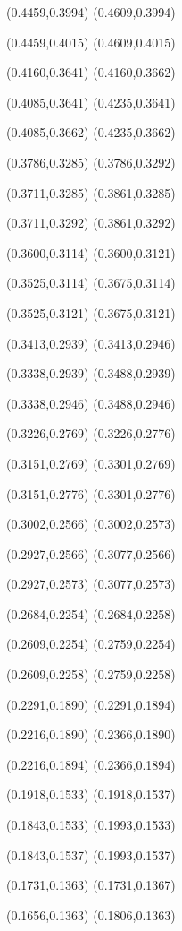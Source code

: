\PST@Dashed(0.4459,0.3994)
(0.4609,0.3994)

\PST@Dashed(0.4459,0.4015)
(0.4609,0.4015)

\PST@Dashed(0.4160,0.3641)
(0.4160,0.3662)

\PST@Dashed(0.4085,0.3641)
(0.4235,0.3641)

\PST@Dashed(0.4085,0.3662)
(0.4235,0.3662)

\PST@Dashed(0.3786,0.3285)
(0.3786,0.3292)

\PST@Dashed(0.3711,0.3285)
(0.3861,0.3285)

\PST@Dashed(0.3711,0.3292)
(0.3861,0.3292)

\PST@Dashed(0.3600,0.3114)
(0.3600,0.3121)

\PST@Dashed(0.3525,0.3114)
(0.3675,0.3114)

\PST@Dashed(0.3525,0.3121)
(0.3675,0.3121)

\PST@Dashed(0.3413,0.2939)
(0.3413,0.2946)

\PST@Dashed(0.3338,0.2939)
(0.3488,0.2939)

\PST@Dashed(0.3338,0.2946)
(0.3488,0.2946)

\PST@Dashed(0.3226,0.2769)
(0.3226,0.2776)

\PST@Dashed(0.3151,0.2769)
(0.3301,0.2769)

\PST@Dashed(0.3151,0.2776)
(0.3301,0.2776)

\PST@Dashed(0.3002,0.2566)
(0.3002,0.2573)

\PST@Dashed(0.2927,0.2566)
(0.3077,0.2566)

\PST@Dashed(0.2927,0.2573)
(0.3077,0.2573)

\PST@Dashed(0.2684,0.2254)
(0.2684,0.2258)

\PST@Dashed(0.2609,0.2254)
(0.2759,0.2254)

\PST@Dashed(0.2609,0.2258)
(0.2759,0.2258)

\PST@Dashed(0.2291,0.1890)
(0.2291,0.1894)

\PST@Dashed(0.2216,0.1890)
(0.2366,0.1890)

\PST@Dashed(0.2216,0.1894)
(0.2366,0.1894)

\PST@Dashed(0.1918,0.1533)
(0.1918,0.1537)

\PST@Dashed(0.1843,0.1533)
(0.1993,0.1533)

\PST@Dashed(0.1843,0.1537)
(0.1993,0.1537)

\PST@Dashed(0.1731,0.1363)
(0.1731,0.1367)

\PST@Dashed(0.1656,0.1363)
(0.1806,0.1363)


